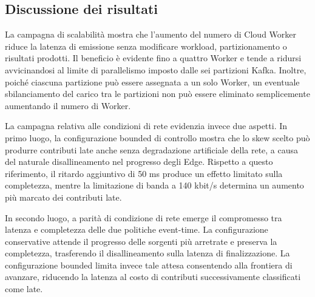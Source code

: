 \subsection{Discussione dei risultati}

La campagna di scalabilità mostra che l'aumento del numero di Cloud Worker
riduce la latenza di emissione senza modificare workload, partizionamento o
risultati prodotti. Il beneficio è evidente fino a quattro Worker e tende a
ridursi avvicinandosi al limite di parallelismo imposto dalle sei partizioni
Kafka. Inoltre, poiché ciascuna partizione può essere assegnata a un solo
Worker, un eventuale sbilanciamento del carico tra le partizioni non può essere
eliminato semplicemente aumentando il numero di Worker.

La campagna relativa alle condizioni di rete evidenzia invece due aspetti.
In primo luogo, la configurazione bounded di controllo mostra che lo skew
scelto può produrre contributi late anche senza degradazione artificiale
della rete, a causa del naturale disallineamento nel progresso degli Edge.
Rispetto a questo riferimento, il ritardo aggiuntivo di 50 ms produce un
effetto limitato sulla completezza, mentre la limitazione di banda a
140 kbit/s determina un aumento più marcato dei contributi late.

In secondo luogo, a parità di condizione di rete emerge il compromesso tra
latenza e completezza delle due politiche event-time. La configurazione
conservative attende il progresso delle sorgenti più arretrate e preserva la
completezza, trasferendo il disallineamento sulla latenza di finalizzazione.
La configurazione bounded limita invece tale attesa consentendo alla frontiera
di avanzare, riducendo la latenza al costo di contributi successivamente
classificati come late.